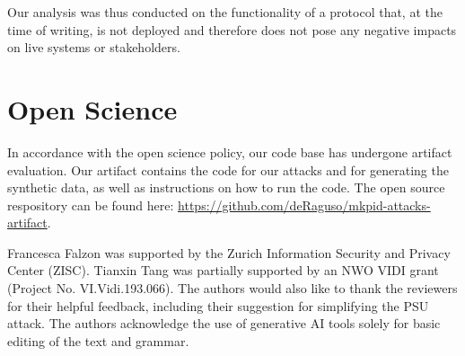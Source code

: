 \documentclass[sigconf,balance=false]{acmart}
\begin{document}
Our analysis was thus conducted on the functionality of a protocol that, at the time of writing, is not deployed and therefore does not pose any negative impacts on live systems or stakeholders.

\section*{Open Science}
In accordance with the open science policy, our code base has undergone artifact evaluation. Our artifact contains the code for our attacks and for generating the synthetic data, as well as instructions on how to run the code. The open source respository can be found here: \href{https://github.com/deRaguso/mkpid-attacks-artifact}{https://github.com/deRaguso/mkpid-attacks-artifact}.


\begin{acks}
Francesca Falzon was supported by the Zurich Information Security and Privacy Center (ZISC).
Tianxin Tang was partially supported by an NWO VIDI grant (Project No. VI.Vidi.193.066).
The authors would also like to thank the reviewers for their helpful feedback, including their suggestion for simplifying the PSU attack.
The authors acknowledge the use of generative AI tools solely for basic editing
of the text and grammar. 
\end{acks}




\appendix









\end{document}
